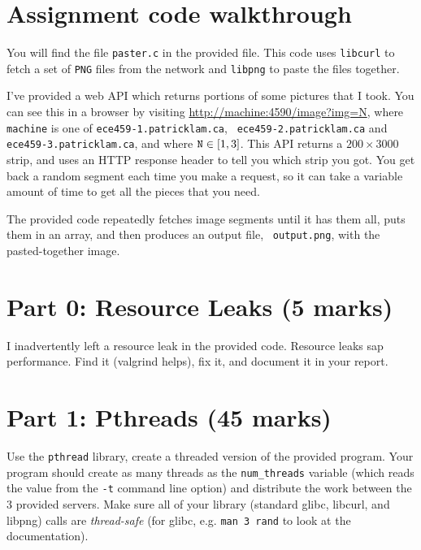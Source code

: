 \documentclass[letterpaper,10pt]{article}
\begin{document}

\section*{Assignment code walkthrough}

You will find the file {\tt paster.c} in the provided file. This code uses
{\tt libcurl} to fetch a set of {\tt PNG} files from the network and {\tt libpng}
to paste the files together.

I've provided a web API which returns portions of some pictures that I took.
You can see this in a browser by visiting 
\url{http://machine:4590/image?img=N},
where {\tt machine} is one of {\tt ece459-1.patricklam.ca}, {\tt
  ece459-2.patricklam.ca} and {\tt ece459-3.patricklam.ca}, and where $\mbox{\tt N} \in [1,3]$. This API returns a $200 \times 3000$ strip, and uses
an HTTP response header to tell you which strip you got. You get back a random
segment each time you make a request, so it can take a variable amount of time to get all the pieces that you need.

The provided code repeatedly fetches image segments until it has them
all, puts them in an array, and then produces an output file, {\tt
  output.png}, with the pasted-together image.

\newpage

\section*{Part 0: Resource Leaks (5 marks)}

I inadvertently left a resource leak in the provided code. Resource
leaks sap performance. Find it (valgrind helps), fix it, and document
it in your report.

\section*{Part 1: Pthreads (45 marks)}

Use the {\tt pthread} library, create a threaded version of the
provided program.  Your program should create as many threads as the
{\tt num\_threads} variable (which reads the value from the {\tt -t}
command line option) and distribute the work between the 3 provided
servers. Make sure all of your library (standard glibc, libcurl, and
libpng) calls are {\it thread-safe} (for glibc, e.g. {\tt man 3 rand} to
look at the documentation).  
\end{document}
